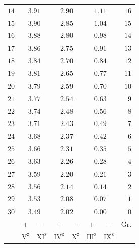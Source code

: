 \begin{center}
\begin{tabular}{r||cc|cc|cc||r}
$14$&\multicolumn{2}{c|}{$3.91$}&\multicolumn{2}{c|}{$2.90$}&\multicolumn{2}{c||}{$1.11$}&$16$\\
$15$&\multicolumn{2}{c|}{$3.90$}&\multicolumn{2}{c|}{$2.85$}&\multicolumn{2}{c||}{$1.04$}&$15$\\
$16$&\multicolumn{2}{c|}{$3.88$}&\multicolumn{2}{c|}{$2.80$}&\multicolumn{2}{c||}{$0.98$}&$14$\\
$17$&\multicolumn{2}{c|}{$3.86$}&\multicolumn{2}{c|}{$2.75$}&\multicolumn{2}{c||}{$0.91$}&$13$\\
$18$&\multicolumn{2}{c|}{$3.84$}&\multicolumn{2}{c|}{$2.70$}&\multicolumn{2}{c||}{$0.84$}&$12$\\
$19$&\multicolumn{2}{c|}{$3.81$}&\multicolumn{2}{c|}{$2.65$}&\multicolumn{2}{c||}{$0.77$}&$11$\\
$20$&\multicolumn{2}{c|}{$3.79$}&\multicolumn{2}{c|}{$2.59$}&\multicolumn{2}{c||}{$0.70$}&$10$\\
$21$&\multicolumn{2}{c|}{$3.77$}&\multicolumn{2}{c|}{$2.54$}&\multicolumn{2}{c||}{$0.63$}&$9$\\
$22$&\multicolumn{2}{c|}{$3.74$}&\multicolumn{2}{c|}{$2.48$}&\multicolumn{2}{c||}{$0.56$}&$8$\\
$23$&\multicolumn{2}{c|}{$3.71$}&\multicolumn{2}{c|}{$2.43$}&\multicolumn{2}{c||}{$0.49$}&$7$\\
$24$&\multicolumn{2}{c|}{$3.68$}&\multicolumn{2}{c|}{$2.37$}&\multicolumn{2}{c||}{$0.42$}&$6$\\
$25$&\multicolumn{2}{c|}{$3.66$}&\multicolumn{2}{c|}{$2.31$}&\multicolumn{2}{c||}{$0.35$}&$5$\\
$26$&\multicolumn{2}{c|}{$3.63$}&\multicolumn{2}{c|}{$2.26$}&\multicolumn{2}{c||}{$0.28$}&$4$\\
$27$&\multicolumn{2}{c|}{$3.59$}&\multicolumn{2}{c|}{$2.20$}&\multicolumn{2}{c||}{$0.21$}&$3$\\
$28$&\multicolumn{2}{c|}{$3.56$}&\multicolumn{2}{c|}{$2.14$}&\multicolumn{2}{c||}{$0.14$}&$2$\\
$29$&\multicolumn{2}{c|}{$3.53$}&\multicolumn{2}{c|}{$2.08$}&\multicolumn{2}{c||}{$0.07$}&$1$\\
$30$&\multicolumn{2}{c|}{$3.49$}&\multicolumn{2}{c|}{$2.02$}&\multicolumn{2}{c||}{$0.00$}&$0$\\
\hline
&$+$&$-$&$+$&$-$&$+$&$-$&Gr.\\
&$\mathrm V^{\mathrm z}$&$\mathrm{XI}^{\mathrm z}$&$\mathrm{IV}^{\mathrm z}$&$\mathrm X^{\mathrm z}$&$\mathrm{III}^{\mathrm z}$&$\mathrm{IX}^{\mathrm z}$&
\end{tabular}
\endgroup
\end{center}
